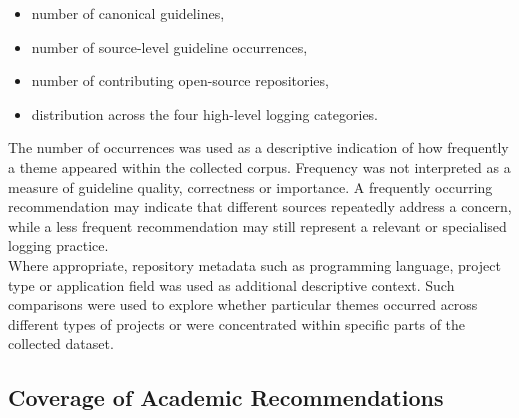 \begin{itemize}
\item number of canonical guidelines,
\item number of source-level guideline occurrences,
\item number of contributing open-source repositories,
\item distribution across the four high-level logging categories.
\end{itemize}

The number of occurrences was used as a descriptive indication of how frequently a
theme appeared within the collected corpus. Frequency was not interpreted as a
measure of guideline quality, correctness or importance. A frequently occurring
recommendation may indicate that different sources repeatedly address a concern, while a less frequent recommendation may still represent a relevant or
specialised logging practice.
\\
Where appropriate, repository metadata such as programming language, project type
or application field was used as additional descriptive context. Such comparisons
were used to explore whether particular themes occurred across different types of
projects or were concentrated within specific parts of the collected dataset.

\subsection{Coverage of Academic Recommendations}

